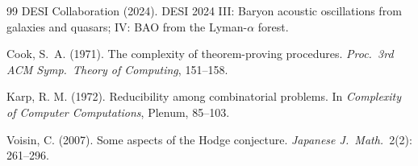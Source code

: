 \documentclass[11pt,a4paper]{article}
\theoremstyle{plain}
\theoremstyle{definition}
\begin{document}
\begin{thebibliography}{99}
DESI Collaboration (2024). DESI 2024 III: Baryon acoustic
oscillations from galaxies and quasars; IV: BAO from the
Lyman-$\alpha$ forest.

Cook, S.\ A. (1971). The complexity of theorem-proving procedures.
\emph{Proc.\ 3rd ACM Symp.\ Theory of Computing}, 151--158.

Karp, R. M. (1972). Reducibility among combinatorial problems.
In \emph{Complexity of Computer Computations}, Plenum, 85--103.

Voisin, C. (2007). Some aspects of the Hodge conjecture.
\emph{Japanese J.\ Math.}\ 2(2): 261--296.

\end{thebibliography}
\end{document}

